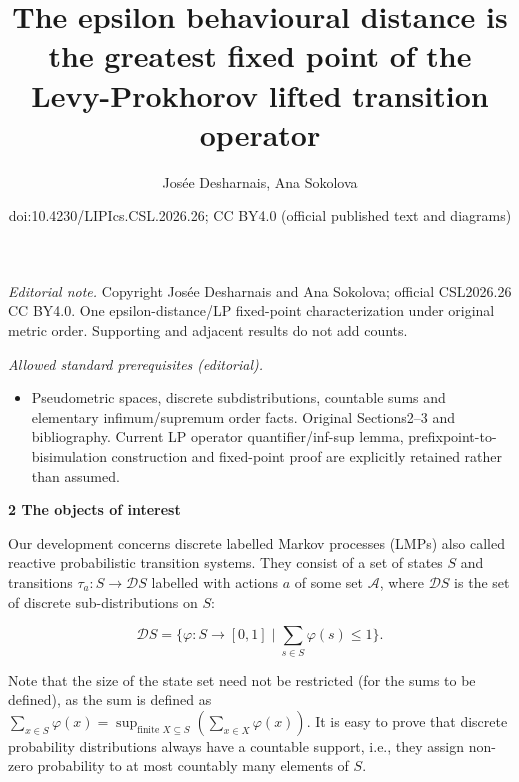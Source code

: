\documentclass[10pt,a4paper]{article}
\title{The epsilon behavioural distance is the greatest fixed point of the Levy-Prokhorov lifted transition operator}
\author{Josée Desharnais, Ana Sokolova}
\date{doi:10.4230/LIPIcs.CSL.2026.26; CC BY4.0 (official published text and diagrams)}
\begin{document}
\maketitle
\noindent\textit{Editorial note.} Copyright Josée Desharnais and Ana Sokolova; official CSL2026.26 CC BY4.0. One epsilon-distance/LP fixed-point characterization under original metric order. Supporting and adjacent results do not add counts.\par\medskip
\noindent\textit{Allowed standard prerequisites (editorial).}\begin{itemize}
\item Pseudometric spaces, discrete subdistributions, countable sums and elementary infimum/supremum order facts. Original Sections2--3 and bibliography. Current LP operator quantifier/inf-sup lemma, prefixpoint-to-bisimulation construction and fixed-point proof are explicitly retained rather than assumed.
\end{itemize}\medskip

 
\par\medskip\noindent\textbf{2 The objects of interest}\par
 
 
Our development concerns discrete labelled Markov processes (LMPs) also called reactive probabilistic transition systems. They consist of a set of states $S$ and transitions $\tau_{a}:S\to\mathcal{D}S$ labelled with actions $a$ of some set $\mathcal{A}$, where $\mathcal{D}S$ is the set of discrete sub-distributions on $S$:\par
  
\par  \quad  \[\mathcal{D}S=\{\varphi\colon S\to[0,1]\mid\sum_{s\in S}\varphi(s)\leq 1\}.\]\quad  \quad  
  
Note that the size of the state set need not be restricted (for the sums to be defined), as the sum is defined as $\sum_{x\in S}\varphi(x)=\sup_{{\textrm{finite }}X\subseteq S}\left(\sum_{x\in X}\varphi(x)\right)$. It is easy to prove that discrete probability distributions always have a countable support, i.e., they assign non-zero probability to at most countably many elements of $S$.\par
 
 
 
\end{document}
